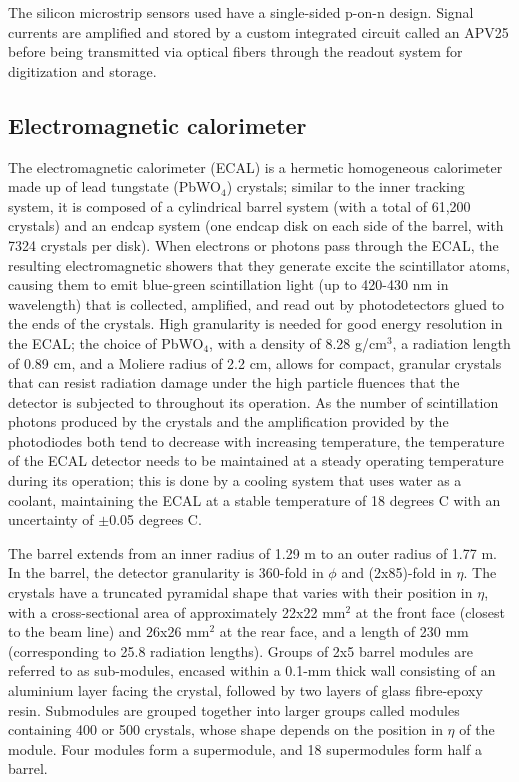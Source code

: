 The silicon microstrip sensors used have a single-sided p-on-n design. Signal currents are amplified and stored by a custom integrated circuit called an APV25 before being transmitted via optical fibers through the readout system for digitization and storage.

\subsection{Electromagnetic calorimeter\label{sec:cms-ecal}}

The electromagnetic calorimeter (ECAL) is a hermetic homogeneous calorimeter made up of lead tungstate (PbWO$_4$) crystals; similar to the inner tracking system, it is composed of a cylindrical barrel system (with a total of 61,200 crystals) and an endcap system (one endcap disk on each side of the barrel, with 7324 crystals per disk). When electrons or photons pass through the ECAL, the resulting electromagnetic showers that they generate excite the scintillator atoms, causing them to emit blue-green scintillation light (up to 420-430 nm in wavelength) that is collected, amplified, and read out by photodetectors glued to the ends of the crystals. High granularity is needed for good energy resolution in the ECAL; the choice of PbWO$_4$, with a density of 8.28 g/cm$^3$, a radiation length of 0.89 cm, and a Moliere radius of 2.2 cm, allows for compact, granular crystals that can resist radiation damage under the high particle fluences that the detector is subjected to throughout its operation. As the number of scintillation photons produced by the crystals and the amplification provided by the photodiodes both tend to decrease with increasing temperature, the temperature of the ECAL detector needs to be maintained at a steady operating temperature during its operation; this is done by a cooling system that uses water as a coolant, maintaining the ECAL at a stable temperature of 18 degrees C with an uncertainty of $\pm$0.05 degrees C.

The barrel extends from an inner radius of 1.29 m to an outer radius of 1.77 m. In the barrel, the detector granularity is 360-fold in $\phi$ and (2x85)-fold in $\eta$. The crystals have a truncated pyramidal shape that varies with their position in $\eta$, with a cross-sectional area of approximately 22x22 mm$^2$ at the front face (closest to the beam line) and 26x26 mm$^2$ at the rear face, and a length of 230 mm (corresponding to 25.8 radiation lengths). Groups of 2x5 barrel modules are referred to as sub-modules, encased within a 0.1-mm thick wall consisting of an aluminium layer facing the crystal, followed by two layers of glass fibre-epoxy resin. Submodules are grouped together into larger groups called modules containing 400 or 500 crystals, whose shape depends on the position in $\eta$ of the module. Four modules form a supermodule, and 18 supermodules form half a barrel.

